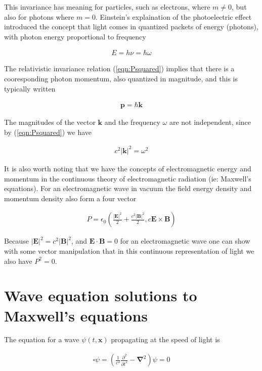 \documentclass[]{eliblog}
\newcommand{\Abs}[1]{{\left\lvert{#1}\right\rvert}}
\newcommand{\BB}[0]{\mathbf{B}}
\newcommand{\BE}[0]{\mathbf{E}}
\newcommand{\Bk}[0]{\mathbf{k}}
\newcommand{\Bp}[0]{\mathbf{p}}
\newcommand{\Bx}[0]{\mathbf{x}}
\newcommand{\cross}[0]{\times}
\newcommand{\spacegrad}[0]{\boldsymbol{\nabla}}
\newcommand{\delambertian}[0]{\square}
\begin{document}
This invariance has meaning for particles, such as electrons, where $m \ne 0$, but also for photons where $m = 0$.  
Einstein's explaination of the photoelectric effect introduced the concept that light comes in
quantized packets of energy (photons), with photon energy proportional to frequency 

\begin{align}
E = h \nu = \hbar \omega
\end{align}

The relativistic invariance relation (\ref{eqn:Psquared}) implies that there is a cooresponding photon momentum, also
quantized in magnitude, and this is typically written

\begin{align}
\Bp = \hbar \Bk
\end{align}

The magnitudes of the vector $\Bk$ and the frequency $\omega$ are not independent, since by (\ref{eqn:Psquared}) we have

\begin{align}\label{eqn:omegaKsquared}
c^2 \Abs{\Bk}^2 = \omega^2
\end{align}

It is also worth noting that we have the concepts of electromagnetic energy and momentum in the continuous theory of
electromagnetic radiation (ie: Maxwell's equations).  For an electromagnetic wave in vacuum the
field energy density and momentum density also form a four vector

\begin{align}
P = \epsilon_0 \left(\frac{\Abs{\BE}^2}{2} + \frac{c^2 \Abs{\BB}^2}{2}, c \BE \cross \BB \right)
\end{align}

Because $\Abs{\BE}^2 = c^2 \Abs{\BB}^2$, and $\BE \cdot \BB = 0$ for an electromagnetic wave one can show with some vector
manipulation that in this continuous representation of light we also have $P^2 = 0$.

\section{Wave equation solutions to Maxwell's equations}

The equation for a wave $\psi(t,\Bx)$ propagating at the speed of light is 

\begin{align}
\delambertian \psi = \left( \frac{1}{c^2}\frac{\partial^2}{{\partial t}^2} - \spacegrad^2 \right) \psi = 0
\end{align}
\end{document}
